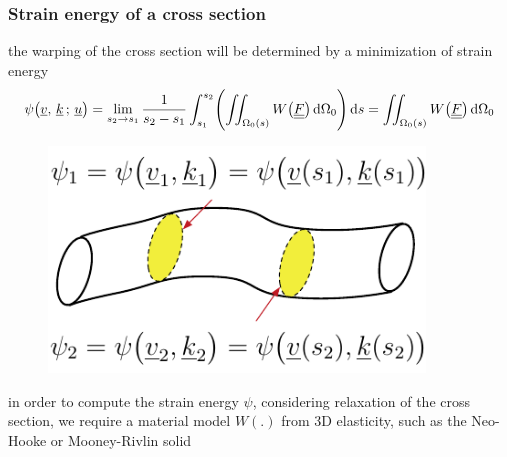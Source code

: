 \begin{frame}
  \frametitle{Strain energy of a cross section}

  the warping of the cross section will be determined by a minimization of strain energy
  \begin{displaymath} %
    \psi \bigl( \underline{v} , \, \underline{k} \, ; \, \underline{u} \bigr) =
    \lim_{s_2 \to s_1} \frac{1}{s_2 - s_1} \int_{s_1}^{s_2}  \Biggl( \iint_{\Omega_0(s)} W \bigl( \doubleunderline{F} \bigr) \dif \Omega_0 \Biggr) \dif s =
    \iint_{\Omega_0(s)} W \bigl( \doubleunderline{F} \bigr) \dif \Omega_0
  \end{displaymath}

  \vspace{0.3em}
  \begin{figure}
    \centering
    \includegraphics[width=10cm, keepaspectratio=true]{sections/cosserat_rods/images/LocalEnergy}
  \end{figure}
  
  \vspace{0.5em}
  in order to compute the strain energy $\psi$, considering relaxation of the cross section,
  we require a material model $W(.)$ from 3D elasticity, such as the Neo-Hooke or Mooney-Rivlin solid
  
\end{frame}


